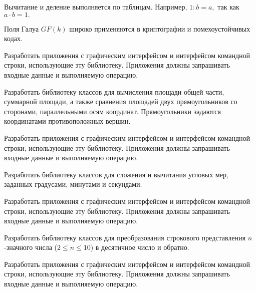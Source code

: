 Вычитание и деление выполняется по таблицам. Например, $1:b = a,$ так
как $a\cdot b=1.$

Поля Галуа $GF(k)$ широко применяются в криптографии и
помехоустойчивых кодах.

Разработать приложения с графическим интерфейсом и интерфейсом
командной строки, использующие эту библиотеку. Приложения должны
запрашивать входные данные и выполняемую операцию.

\task Разработать библиотеку классов для вычисления площади общей
части, суммарной площади, а также сравнения площадей двух
прямоугольников со сторонами, параллельными осям
координат. Прямоугольники задаются координатами противоположных
вершин.

Разработать приложения с графическим интерфейсом и интерфейсом
командной строки, использующие эту библиотеку. Приложения должны
запрашивать входные данные и выполняемую операцию.

\task Разработать библиотеку классов для сложения и вычитания угловых
мер, заданных градусами, минутами и секундами.

Разработать приложения с графическим интерфейсом и интерфейсом
командной строки, использующие эту библиотеку. Приложения должны
запрашивать входные данные и выполняемую операцию.

\task Разработать библиотеку классов для преобразования строкового
представления $n$-значного числа ($2\leqslant n \leqslant 10$) в
десятичное число и обратно.

Разработать приложения с графическим интерфейсом и интерфейсом
командной строки, использующие эту библиотеку. Приложения должны
запрашивать входные данные и выполняемую операцию.
